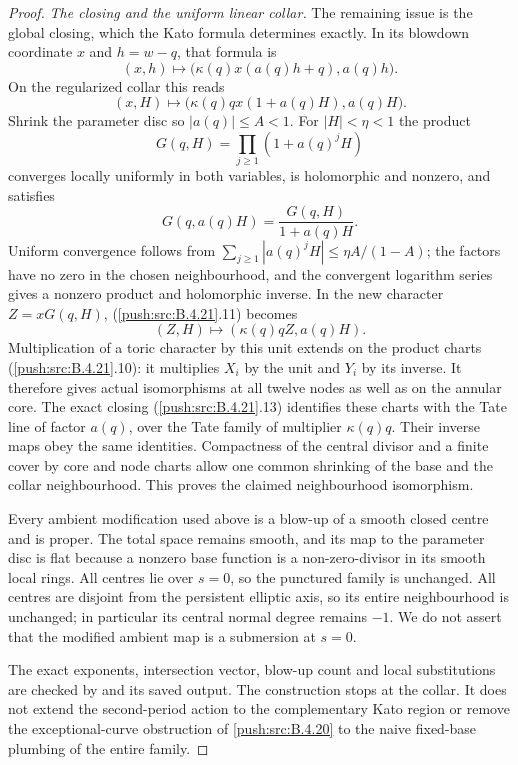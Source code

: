 \begin{proof}
\emph{The closing and the uniform linear collar.}
The remaining issue is the global closing, which the Kato
formula determines exactly.  In its blowdown coordinate $x$
and $h=w-q$, that formula is
\[
 (x,h)\longmapsto
 \bigl(\kappa(q)x(a(q)h+q),a(q)h\bigr).
\]
On the regularized collar this reads
\[
 (x,H)\longmapsto
 \bigl(\kappa(q)q x(1+a(q)H),a(q)H\bigr).
 \tag{B.4.21.11}
\]
Shrink the parameter disc so $|a(q)|\le A<1$.
For $|H|<\eta<1$ the product
\[
 G(q,H)=\prod_{j\ge1}(1+a(q)^jH)
 \tag{B.4.21.12}
\]
converges locally uniformly in both variables, is holomorphic
and nonzero, and satisfies
\[
 G(q,a(q)H)=\frac{G(q,H)}{1+a(q)H}.
\]
Uniform convergence follows from
$\sum_{j\ge1}|a(q)^jH|\le\eta A/(1-A)$; the factors have
no zero in the chosen neighbourhood, and the convergent
logarithm series gives a nonzero product and holomorphic inverse.
In the new character $Z=xG(q,H)$, (\ref{push:src:B.4.21}.11) becomes
\[
 (Z,H)\longmapsto
       (\kappa(q)qZ,a(q)H).
 \tag{B.4.21.13}
\]
Multiplication of a toric character by this unit extends on
the product charts (\ref{push:src:B.4.21}.10): it multiplies $X_i$ by the
unit and $Y_i$ by its inverse.  It therefore gives actual
isomorphisms at all twelve nodes as well as on the annular
core.  The exact closing (\ref{push:src:B.4.21}.13) identifies these charts
with the Tate line of factor $a(q)$, over the Tate family
of multiplier $\kappa(q)q$.  Their inverse maps obey the
same identities.  Compactness of the central divisor and
a finite cover by core and node charts allow one common
shrinking of the base and the collar neighbourhood.
This proves the claimed neighbourhood isomorphism.

Every ambient modification used above is a blow-up of a smooth
closed centre and is proper.  The total space remains smooth,
and its map to the parameter disc is flat because a nonzero
base function is a non-zero-divisor in its smooth local rings.
All centres lie over $s=0$, so the punctured family is unchanged.
All centres are disjoint from the persistent elliptic axis,
so its entire neighbourhood is unchanged; in particular its
central normal degree remains $-1$.
We do not assert that the modified ambient map is a submersion
at $s=0$.

The exact exponents, intersection vector, blow-up count and
local substitutions are checked by
 and its saved
output.  The construction stops at the collar.  It does not
extend the second-period action to the complementary Kato
region or remove the exceptional-curve obstruction of \ref{push:src:B.4.20}
to the naive fixed-base plumbing of the entire family.
\end{proof}

